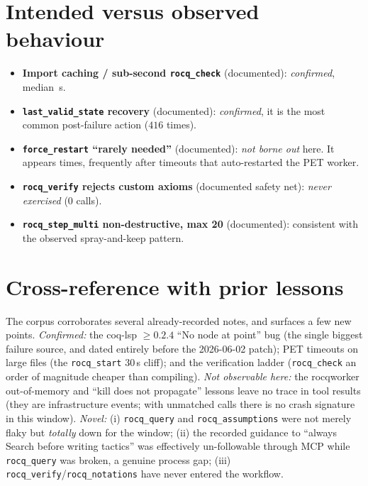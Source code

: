 \documentclass[11pt]{article}
\newcommand{\tl}[1]{\texttt{#1}}
\newcommand{\rstart}{\tl{rocq\_start}}
\newcommand{\rcheck}{\tl{rocq\_check}}
\newcommand{\rquery}{\tl{rocq\_query}}
\newcommand{\rstep}{\tl{rocq\_step\_multi}}
\newcommand{\rverify}{\tl{rocq\_verify}}
\newcommand{\rassum}{\tl{rocq\_assumptions}}
\newcommand{\rnot}{\tl{rocq\_notations}}
\begin{document}
\section{Intended versus observed behaviour}
\begin{itemize}[leftmargin=1.4em,itemsep=2pt]
\item \textbf{Import caching / sub-second \rcheck{}} (documented): \emph{confirmed},
median \Checkmed\,s.
\item \textbf{\texttt{last\_valid\_state} recovery} (documented): \emph{confirmed},
it is the most common post-failure action (\(416\) times).
\item \textbf{\texttt{force\_restart} ``rarely needed''} (documented): \emph{not
borne out} here. It appears \Forcerestart{} times, frequently after timeouts that
auto-restarted the PET worker.
\item \textbf{\rverify{} rejects custom axioms} (documented safety net):
\emph{never exercised} (0 calls).
\item \textbf{\rstep{} non-destructive, max 20} (documented): consistent with the
observed spray-and-keep pattern.
\end{itemize}

\section{Cross-reference with prior lessons}
The corpus corroborates several already-recorded notes, and surfaces a few new
points. \emph{Confirmed:} the coq-lsp \(\ge0.2.4\) ``No node at point'' bug (the
single biggest failure source, and dated entirely before the 2026-06-02 patch);
PET timeouts on large files (the \rstart{} 30\,s cliff); and the verification
ladder (\rcheck{} an order of magnitude cheaper than compiling). \emph{Not
observable here:} the rocqworker out-of-memory and ``kill does not propagate''
lessons leave no trace in tool results (they are infrastructure events; with
\Nunmatched{} unmatched calls there is no crash signature in this window).
\emph{Novel:} (i) \rquery{} and \rassum{} were not merely flaky but \emph{totally}
down for the window; (ii) the recorded guidance to ``always Search before writing
tactics'' was effectively un-followable through MCP while \rquery{} was broken, a
genuine process gap; (iii) \rverify{}/\rnot{} have never entered the workflow.
\end{document}
